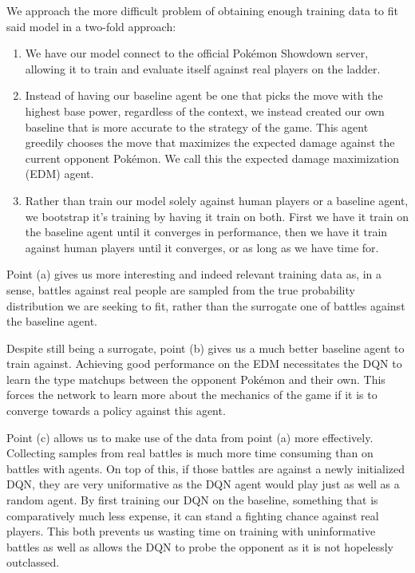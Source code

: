 \documentclass{article}
\begin{document}
We approach the more difficult problem of obtaining enough training data to fit said model in a two-fold approach:
\begin{enumerate}[label=(\alph*)]
  \item We have our model connect to the official Pokémon Showdown server, allowing it to train and evaluate itself against real players on the ladder.
  \item Instead of having our baseline agent be one that picks the move with the highest base power, regardless of the context, we instead created our own baseline that is more accurate to the strategy of the game. This agent greedily chooses the move that maximizes the expected damage against the current opponent Pokémon. We call this the expected damage maximization (EDM) agent.
  \item Rather than train our model solely against human players or a baseline agent, we bootstrap it's training by having it train on both. First we have it train on the baseline agent until it converges in performance, then we have it train against human players until it converges, or as long as we have time for.
\end{enumerate}

Point (a) gives us more interesting and indeed relevant training data as, in a sense, battles against real people are sampled from the true probability distribution we are seeking to fit, rather than the surrogate one of battles against the baseline agent.

Despite still being a surrogate, point (b) gives us a much better baseline agent to train against. Achieving good performance on the EDM necessitates the DQN to learn the type matchups between the opponent Pokémon and their own. This forces the network to learn more about the mechanics of the game if it is to converge towards a policy against this agent. 

Point (c) allows us to make use of the data from point (a) more effectively. Collecting samples from real battles is much more time consuming than on battles with agents. On top of this, if those battles are against a newly initialized DQN, they are very uniformative as the DQN agent would play just as well as a random agent. By first training our DQN on the baseline, something that is comparatively much less expense, it can stand a fighting chance against real players. This both prevents us wasting time on training with uninformative battles as well as allows the DQN to probe the opponent as it is not hopelessly outclassed.
\end{document}
